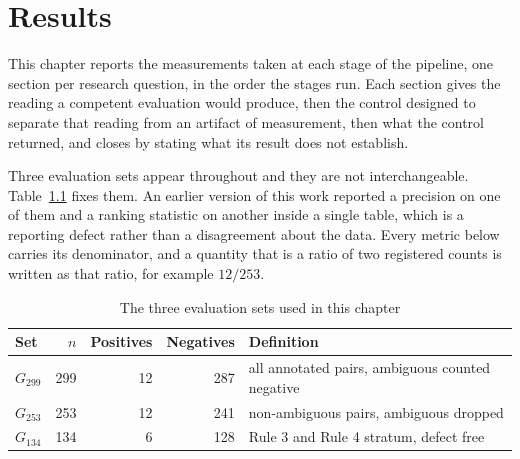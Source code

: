 %

\chapter{Results}
\label{ch:results}

This chapter reports the measurements taken at each stage of the pipeline, one
section per research question, in the order the stages run. Each section gives
the reading a competent evaluation would produce, then the control designed to
separate that reading from an artifact of measurement, then what the control
returned, and closes by stating what its result does not establish.

Three evaluation sets appear throughout and they are not interchangeable.
Table~\ref{tab:denoms} fixes them. An earlier version of this work reported a
precision on one of them and a ranking statistic on another inside a single
table, which is a reporting defect rather than a disagreement about the data.
Every metric below carries its denominator, and a quantity that is a ratio of
two registered counts is written as that ratio, for example $12/253$.

\begin{table}[H]
\caption{The three evaluation sets used in this chapter}
\centering
\small
\begin{tabular}{lrrrl}
\toprule
\textbf{Set} & \textbf{$n$} & \textbf{Positives} & \textbf{Negatives} &
\textbf{Definition} \\
\midrule
$G_{299}$ & 299 & 12 & 287 & all annotated pairs, ambiguous counted negative \\
$G_{253}$ & 253 & 12 & 241 & non-ambiguous pairs, ambiguous dropped \\
$G_{134}$ & 134 & 6  & 128 & Rule 3 and Rule 4 stratum, defect free \\
\bottomrule
\end{tabular}
\label{tab:denoms}
\end{table}


